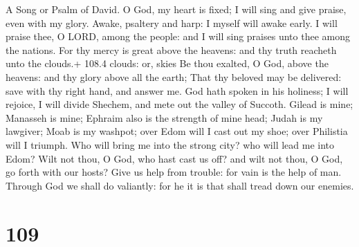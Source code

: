 A Song or Psalm of David.  O God, my heart is fixed; I will
sing and give praise, even with my glory.  Awake, psaltery
and harp: I myself will awake early.  I will praise thee, O
LORD, among the people: and I will sing praises unto thee among the
nations.  For thy mercy is great above the heavens: and thy
truth reacheth unto the clouds.+ 108.4 clouds: or, skies  Be
thou exalted, O God, above the heavens: and thy glory above all the
earth;  That thy beloved may be delivered: save with thy
right hand, and answer me.  God hath spoken in his holiness;
I will rejoice, I will divide Shechem, and mete out the valley of
Succoth.  Gilead is mine; Manasseh is mine; Ephraim also is
the strength of mine head; Judah is my lawgiver;  Moab is my
washpot; over Edom will I cast out my shoe; over Philistia will I
triumph.  Who will bring me into the strong city? who will
lead me into Edom?  Wilt not thou, O God, who hast cast us
off? and wilt not thou, O God, go forth with our hosts? 
Give us help from trouble: for vain is the help of man. 
Through God we shall do valiantly: for he it is that shall tread down
our enemies.

\hypertarget{section-108}{%
\section{109}\label{section-108}}

